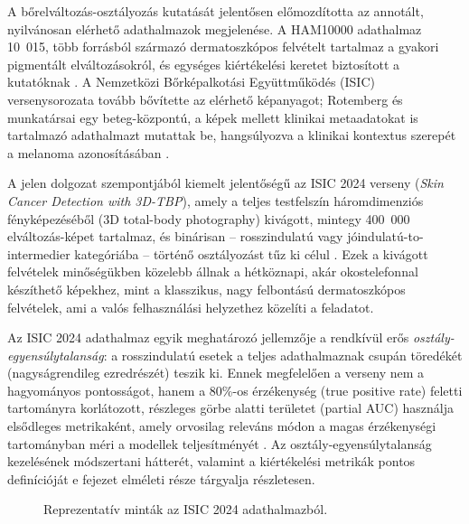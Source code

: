 A bőrelváltozás-osztályozás kutatását jelentősen előmozdította az annotált,
nyilvánosan elérhető adathalmazok megjelenése. A HAM10000 adathalmaz 10~015,
több forrásból származó dermatoszkópos felvételt tartalmaz a gyakori pigmentált
elváltozásokról, és egységes kiértékelési keretet biztosított a kutatóknak
\cite{tschandl2019ham10000}. A Nemzetközi Bőrképalkotási Együttműködés (ISIC)
versenysorozata tovább bővítette az elérhető képanyagot; Rotemberg és
munkatársai egy beteg-központú, a képek mellett klinikai metaadatokat is
tartalmazó adathalmazt mutattak be, hangsúlyozva a klinikai kontextus
szerepét a melanoma azonosításában \cite{rotemberg2021isic}.

A jelen dolgozat szempontjából kiemelt jelentőségű az ISIC 2024 verseny
(\textit{Skin Cancer Detection with 3D-TBP}), amely a teljes testfelszín
háromdimenziós fényképezéséből (3D total-body photography) kivágott, mintegy
400~000 elváltozás-képet tartalmaz, és binárisan -- rosszindulatú vagy
jó\-indulatú-to-intermedier kategóriába -- történő osztályozást tűz ki célul
\cite{isic2024}. Ezek a kivágott felvételek minőségükben közelebb állnak a
hétköznapi, akár okostelefonnal készíthető képekhez, mint a klasszikus,
nagy felbontású dermatoszkópos felvételek, ami a valós felhasználási
helyzethez közelíti a feladatot.

Az ISIC 2024 adathalmaz egyik meghatározó jellemzője a rendkívül erős
\textit{osztály-egyensúlytalanság}: a rosszindulatú esetek a teljes adathalmaznak
csupán töredékét (nagyságrendileg ezredrészét) teszik ki. Ennek megfelelően a
verseny nem a hagyományos pontosságot, hanem a 80\%-os érzékenység (true positive
rate) feletti tartományra korlátozott, részleges görbe alatti területet (partial
AUC) használja elsődleges metrikaként, amely orvosilag releváns módon a magas
érzékenységi tartományban méri a modellek teljesítményét \cite{isic2024}. Az
osztály-egyensúlytalanság kezelésének módszertani hátterét, valamint a
kiértékelési metrikák pontos definícióját e fejezet elméleti része tárgyalja
részletesen.

\begin{figure}[H]
  \centering
  \caption{Reprezentatív minták az ISIC 2024 adathalmazból.}
  \label{fig:isic-samples}
\end{figure}

